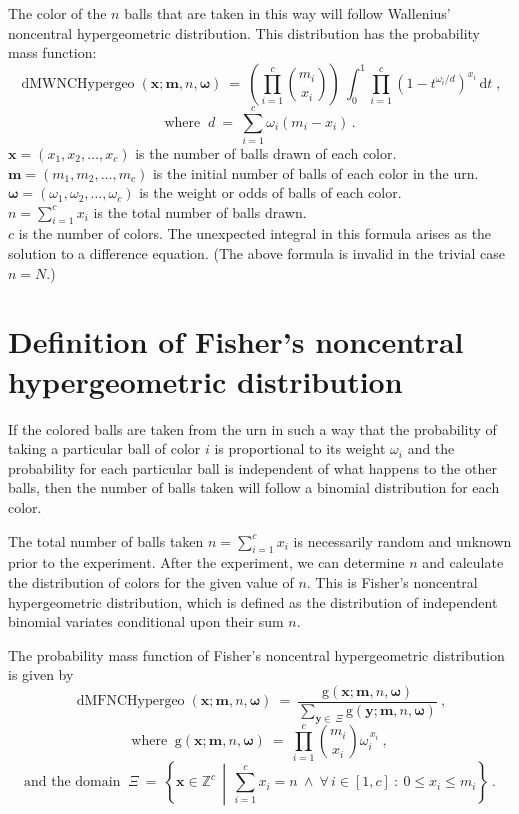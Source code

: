\documentclass[a4paper]{article}
\begin{document}
The color of the $n$ balls that are taken in this way will follow Wallenius'
noncentral hypergeometric distribution. This distribution has the 
probability mass function:
%
$$
\operatorname{dMWNCHypergeo}(\boldsymbol{x};\boldsymbol{m},n,\boldsymbol{\omega}) 
\:=\: 
\left( \prod_{i=1}^c \binom{m_i}{x_i} \right)
\: \int_0^1 \prod_{i=1}^c
(1-t^{{\omega_i}/{d}})^{x_i} \, \mathrm{d}t \;,
$$
%
$$
\text{where } \: d \:=\:
\sum_{i=1}^c \omega_i(m_i-x_i) \,.
$$
%
$\boldsymbol{x}=(x_1,x_2,\ldots,x_c)$ 
is the number of balls drawn of each color.\\
$\boldsymbol{m}=(m_1,m_2,\ldots,m_c)$ 
is the initial number of balls of each color in the urn.\\
$\boldsymbol{\omega}=(\omega_1,\omega_2,\ldots,\omega_c)$
is the weight or odds of balls of each color.\\
$n = \sum_{i=1}^c x_i$ is the total number of balls drawn.\\
$c$ is the number of colors. The unexpected integral in this 
formula arises as the solution to a difference equation.
(The above formula is invalid in the trivial case $n = N$.)


\section{Definition of Fisher's noncentral hypergeometric distribution}
%
If the colored balls are taken from the urn in such a way that 
the probability of taking a particular ball of color $i$ is 
proportional to its weight $\omega_i$ and the probability for
each particular ball is independent of what happens to the 
other balls, then the number of balls taken will follow a
binomial distribution for each color.

The total number of balls taken $n = \sum_{i=1}^c x_i$ is
necessarily random and unknown prior to the experiment.
After the experiment, we can determine $n$ and calculate the
distribution of colors for the given value of $n$.
This is Fisher's noncentral hypergeometric distribution, which
is defined as the distribution of independent binomial variates
conditional upon their sum $n$.

The probability mass function of Fisher's noncentral hypergeometric 
distribution is given by
%
$$
\operatorname{dMFNCHypergeo}(\boldsymbol{x};\boldsymbol{m},n,\boldsymbol{\omega})
\:=\:
\frac{\textrm{g}(\boldsymbol{x};\boldsymbol{m},n,\boldsymbol{\omega})}
{\sum\limits_{\boldsymbol{y}\in \: \Xi}
\textrm{g}(\boldsymbol{y};\boldsymbol{m},n,\boldsymbol{\omega})}\:,
$$
%
$$
\text{where } \: \textrm{g}(\boldsymbol{x};\boldsymbol{m},n,\boldsymbol{\omega})
\:=\: \prod_{i=1}^c
\binom{m_i}{x_i}\omega_i^{\,x_i}\:,
$$
%
$$
\text{and the domain }\: \Xi \:=\: \left\{\boldsymbol{x}\in\mathbb{Z}^c \,\middle|\,
\sum_{i=1}^c x_i = n \: \wedge \: 
\forall\, i \in [1,c] \: : \: 0 \leq x_i \leq m_i \right\}\:.
$$
\end{document}
